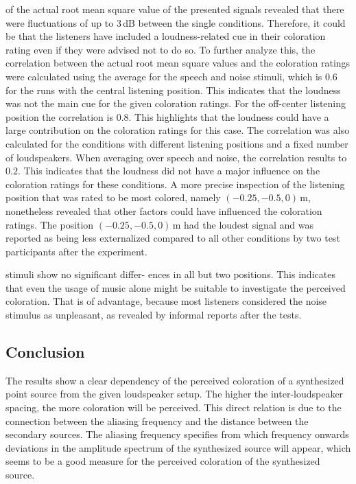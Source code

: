  of the actual root mean square value of the presented signals
revealed that there were fluctuations of up to $3$\,dB between the single
conditions. Therefore, it could be that the listeners have included a
loudness-related cue in their coloration rating even if they were advised not to
do so.
To further analyze this, the correlation between the actual root mean square
values and the coloration ratings were calculated using the average for the speech
and noise stimuli, which is $0.6$ for the runs with the central listening position.
This indicates that the loudness was not the main cue for the given coloration
ratings. For the off-center listening position the correlation is $0.8$.
This highlights that the loudness could have a large contribution on the
coloration ratings for this case.
The correlation was also calculated for the conditions with different listening
positions and a fixed number of loudspeakers. When averaging over speech and
noise, the correlation results to $0.2$.
This 
indicates that the loudness did not have a major influence on the coloration ratings
for these conditions.
A more precise inspection of the listening position that was rated to be
most colored, namely $(-0.25,-0.5,0)$\,m,
nonetheless revealed that other factors could have influenced the coloration ratings.
The position $(-0.25,-0.5,0)$\,m had the loudest signal and was reported as
being less externalized compared to all other conditions by two test
participants after the experiment.

 stimuli show no significant differ- ences in all but two
positions. This indicates that even the usage of music alone might
be suitable to investigate the perceived coloration. That is of advantage,
because most listeners considered the noise stimulus as unpleasant, as revealed by
informal reports after the tests.


\subsection{Conclusion}
\label{sec:coloration_conclusion}
%
The results show a clear dependency of the perceived coloration of a synthesized
point source from the given loudspeaker setup. The higher the inter-loudspeaker
spacing, the more coloration will be perceived. This direct relation is due to
the connection between the
aliasing frequency and the distance between the secondary sources. The aliasing
frequency specifies from which frequency onwards deviations in the amplitude spectrum
of the synthesized source will appear, which seems to be a good measure for the
perceived coloration of the synthesized source.

